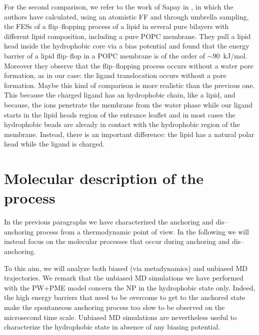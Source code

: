 For the second comparison, we refer to the work of Sapay \etal in \cite{Sapay2009}, in which the authors have calculated, using an atomistic \ac{FF} and through umbrella sampling, the \acp{FES} of a flip--flopping process of a lipid in several pure bilayers with different lipid composition, including a pure \ac{POPC} membrane. They pull a lipid head inside the hydrophobic core via a bias potential and found that the energy barrier of a lipid flip--flop in a \ac{POPC} membrane is of the order of $\sim 90$~kJ/mol. Moreover they observe that the flip--flopping process occurs without a water pore formation, as in our case: the  ligand translocation occurs without a pore formation. Maybe this kind of comparison is more realistic than the previous one. This because the charged ligand has an hydrophobic chain, like a lipid, and because, the ions penetrate the membrane from the water phase while our ligand starts in the lipid heads region of the entrance leaflet and in most cases the hydrophobic beads are already in contact with the hydrophobic region of the membrane. Instead, there is an important difference: the lipid has a natural polar head while the ligand is charged.

\section{Molecular description of the process}
\label{sec:resultsUnBiased}
In the previous paragraphs we have characterized the anchoring and dis--anchoring process from a thermodynamic point of view. In the following we will instead focus on the molecular processes that occur during anchoring and dis--anchoring.

To this aim, we will analyze both biased (via metadynamics) and unbiased \ac{MD} trajectories. We remark that the unbiased \ac{MD} simulations we have performed with the \ac{PW}+\ac{PME} model concern the \ac{NP} in the hydrophobic state only. Indeed, the high energy barriers that need to be overcome to get to the anchored state make the spontaneous anchoring process too slow to be observed on the microsecond time scale. Unbiased \ac{MD} simulations are nevertheless useful to characterize the hydrophobic state in absence of any biasing potential. 

